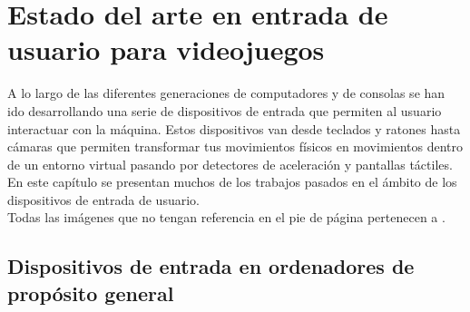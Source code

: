 %
%
%
%
%
%
%
%
%
%

\chapter{Estado del arte en entrada de usuario para videojuegos}
\label{cap2}


A lo largo de las diferentes generaciones de computadores y de consolas se han ido desarrollando una serie de dispositivos de entrada que permiten al usuario interactuar con la m\'aquina. Estos dispositivos van desde teclados y ratones hasta c\'amaras que permiten transformar tus movimientos f\'isicos en movimientos dentro de un entorno virtual pasando por detectores de aceleraci\'on y pantallas t\'actiles. En este cap\'itulo se presentan muchos de los trabajos pasados en el \'ambito de los dispositivos de entrada de usuario.\\

Todas las im\'agenes que no tengan referencia en el pie de p\'agina pertenecen a \cite{gameconsoles}.


\section{Dispositivos de entrada en ordenadores de prop\'osito general}


